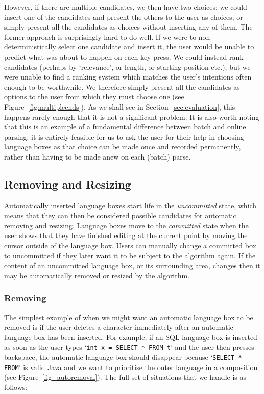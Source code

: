 \documentclass[sigplan,screen]{acmart}
\begin{document}
\label{multiple candidates}
However, if there are multiple candidates, we then have two choices: we could
insert one of the candidates and present the others to the user as choices; or
simply present all the candidates as choices without inserting
any of them. The former approach is surprisingly hard to do well. If we were to
non-deterministically select one candidate and insert it, the user would be
unable to predict what was about to happen on each key press. We could instead
rank candidates (perhaps by `relevance', or length, or starting position etc.),
but we were unable to find a ranking system which matches the user's intentions
often enough to be worthwhile. We therefore simply present all the candidates
as options to the user from which they must choose one (see Figure~\ref{fig:multiplecnds}). As we shall see in
Section~\ref{sec:evaluation}, this happens rarely enough that it is not a
significant problem. It is also worth noting that this is an
example of a fundamental difference between batch and online parsing:
it is entirely feasible for us
to ask the user for their help in choosing language boxes as that choice can
be made once and recorded permanently, rather than having to be made anew
on each (batch) parse.


\begin{center}
\end{center}


\subsection{Removing and Resizing}

Automatically inserted language boxes start life in the \emph{uncommitted}
state, which means that they can then be considered possible candidates for
automatic removing and resizing. Language boxes move to the \emph{committed}
state when the user shows that they have finished
editing at the current point by moving the cursor outside of the language box.
Users can manually change a committed box to uncommitted if they
later want it to be subject to the algorithm again. If the content of an
uncommitted language box, or its surrounding area, changes then it may be
automatically removed or resized by the algorithm.


\subsubsection{Removing}
\label{sec:removing}

The simplest example of when we might want an automatic language box to be removed is if
the user deletes a character immediately after an automatic language box has
been inserted. For example, if an SQL language box is inserted as soon as the
user types `\texttt{int x = SELECT * FROM t}' and the user then presses
backspace, the automatic language box should disappear because `\texttt{SELECT
* FROM}' is valid Java and we want to prioritise the outer language in a
composition (see Figure~\ref{fig_autoremoval}). The full set of situations that
we handle is as follows:
\end{document}
